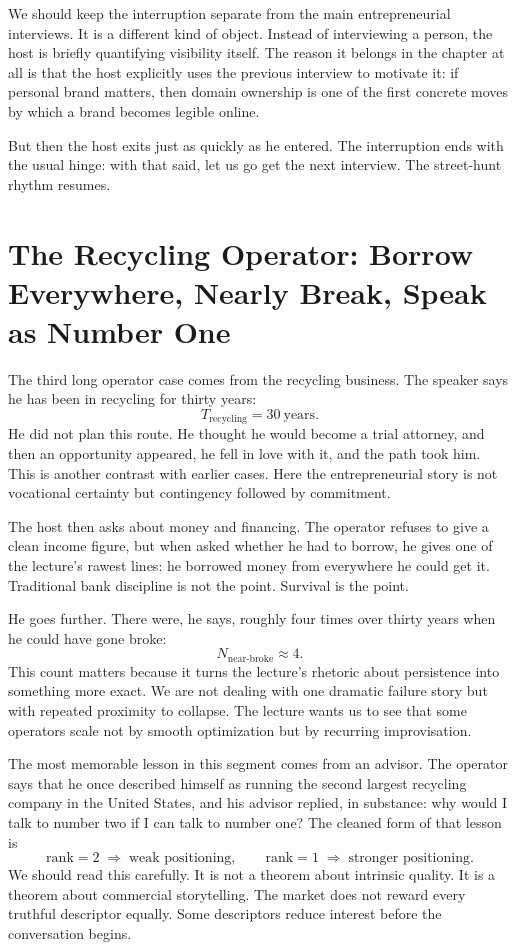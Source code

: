 We should keep the interruption separate from the main entrepreneurial interviews. It is a different kind of object. Instead of interviewing a person, the host is briefly quantifying visibility itself. The reason it belongs in the chapter at all is that the host explicitly uses the previous interview to motivate it: if personal brand matters, then domain ownership is one of the first concrete moves by which a brand becomes legible online.

But then the host exits just as quickly as he entered. The interruption ends with the usual hinge: with that said, let us go get the next interview. The street-hunt rhythm resumes.

\section{The Recycling Operator: Borrow Everywhere, Nearly Break, Speak as Number One}

The third long operator case comes from the recycling business. The speaker says he has been in recycling for thirty years:
\begin{equation}
T_{\text{recycling}} = 30\ \text{years}.
\end{equation}
He did not plan this route. He thought he would become a trial attorney, and then an opportunity appeared, he fell in love with it, and the path took him. This is another contrast with earlier cases. Here the entrepreneurial story is not vocational certainty but contingency followed by commitment.

The host then asks about money and financing. The operator refuses to give a clean income figure, but when asked whether he had to borrow, he gives one of the lecture's rawest lines: he borrowed money from everywhere he could get it. Traditional bank discipline is not the point. Survival is the point.

He goes further. There were, he says, roughly four times over thirty years when he could have gone broke:
\begin{equation}
N_{\text{near-broke}} \approx 4.
\end{equation}
This count matters because it turns the lecture's rhetoric about persistence into something more exact. We are not dealing with one dramatic failure story but with repeated proximity to collapse. The lecture wants us to see that some operators scale not by smooth optimization but by recurring improvisation.

The most memorable lesson in this segment comes from an advisor. The operator says that he once described himself as running the second largest recycling company in the United States, and his advisor replied, in substance: why would I talk to number two if I can talk to number one? The cleaned form of that lesson is
\begin{equation}
\text{rank}=2 \;\Rightarrow\; \text{weak positioning},
\qquad
\text{rank}=1 \;\Rightarrow\; \text{stronger positioning}.
\end{equation}
We should read this carefully. It is not a theorem about intrinsic quality. It is a theorem about commercial storytelling. The market does not reward every truthful descriptor equally. Some descriptors reduce interest before the conversation begins.

